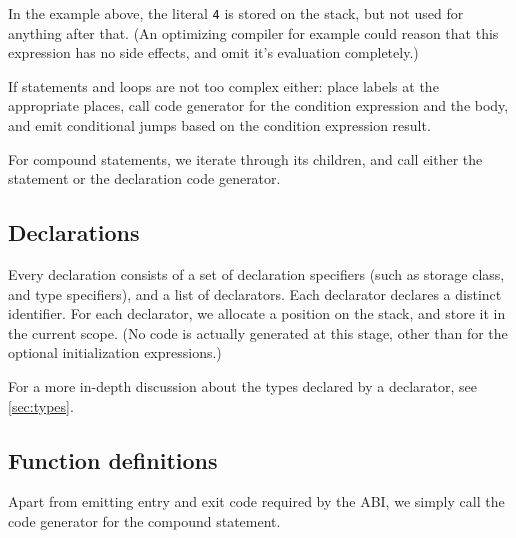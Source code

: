 \documentclass[12pt]{article}
\begin{document}

In the example above, the literal \texttt{4} is stored on the stack, but not
used for anything after that. (An optimizing compiler for example could reason
that this expression has no side effects, and omit it's evaluation completely.)

If statements and loops are not too complex either: place labels at the
appropriate places, call code generator for the condition expression and the
body, and emit conditional jumps based on the condition expression result.


For compound statements, we iterate through its children, and call either the
statement or the declaration code generator.

\subsection{Declarations}
Every declaration consists of a set of declaration specifiers (such as storage
class, and type specifiers), and a list of declarators. Each declarator
declares a distinct identifier. For each declarator, we allocate a position on
the stack, and store it in the current scope. (No code is actually generated at
this stage, other than for the optional initialization expressions.)

For a more in-depth discussion about the types declared by a declarator, see
\ref{sec:types}.

\subsection{Function definitions}
Apart from emitting entry and exit code required by the ABI, we simply call the
code generator for the compound statement.
\end{document}
